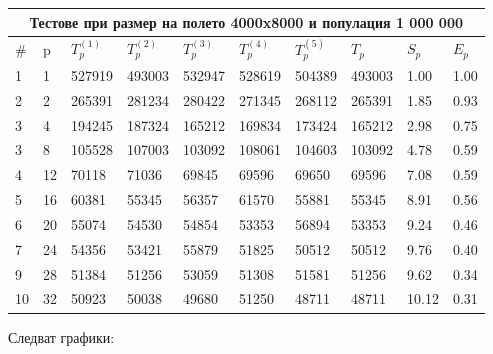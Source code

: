 \documentclass[12pt]{article}
\begin{document}
\bigbreak

\begin{tabular}{ |p{0.4cm}||p{0.4cm}|p{1.1cm}|p{1.1cm}|p{1.1cm}|p{1.1cm}|p{1.1cm}|p{1.1cm}|p{0.9cm}|p{0.9cm}| }
 \hline
 \multicolumn{10}{|c|}{Тестове при размер на полето 4000x8000 и популация 1 000 000} \\
 \hline
 \# & p & $T^{(1)}_p$ & $T^{(2)}_p$ & $T^{(3)}_p$ & $T^{(4)}_p$ & $T^{(5)}_p$ & $T_p$ & $S_p$ & $E_p$ \\
 \hline
1  & 1  & 527919 & 493003 & 532947 & 528619 & 504389 & 493003 & 1.00 & 1.00 \\
2  & 2  & 265391 & 281234 & 280422 & 271345 & 268112 & 265391 & 1.85 & 0.93 \\
3  & 4  & 194245  & 187324 & 165212 & 169834 & 173424 & 165212 & 2.98 & 0.75 \\
3  & 8  & 105528 & 107003 & 103092 & 108061 & 104603 & 103092 & 4.78 & 0.59 \\
4  & 12 & 70118 & 71036 & 69845 & 69596 & 69650 & 69596 & 7.08 & 0.59 \\
5  & 16 & 60381 & 55345 & 56357 & 61570 & 55881 & 55345 & 8.91 & 0.56 \\
6  & 20 & 55074 & 54530 & 54854 & 53353 & 56894 & 53353 & 9.24 & 0.46 \\
7  & 24 & 54356 & 53421 & 55879 & 51825 & 50512 & 50512 & 9.76 & 0.40 \\
9  & 28 & 51384 & 51256 & 53059 & 51308 & 51581 & 51256 & 9.62 & 0.34 \\
10 & 32 & 50923 & 50038 & 49680 & 51250 & 48711 & 48711 & 10.12 & 0.31 \\
 \hline
\end{tabular}
\bigbreak
Следват графики:
\bigbreak

\hspace*{-2cm}
\hskip 5pt
\end{document}
